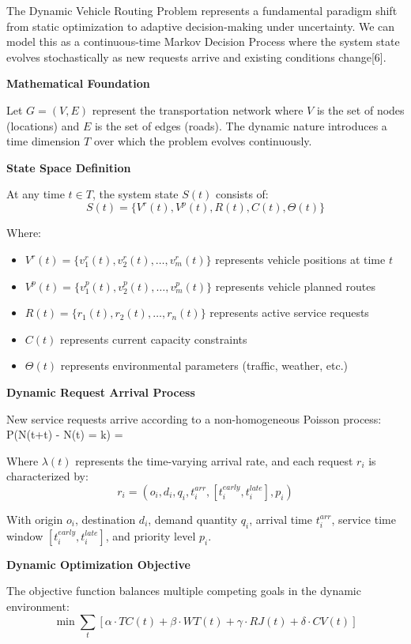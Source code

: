 \documentclass{article}
\begin{document}
The Dynamic Vehicle Routing Problem represents a fundamental paradigm shift from static optimization to adaptive decision-making under uncertainty. We can model this as a continuous-time Markov Decision Process where the system state evolves stochastically as new requests arrive and existing conditions change[6].

\textbf{Mathematical Foundation}

Let $G = (V, E)$ represent the transportation network where $V$ is the set of nodes (locations) and $E$ is the set of edges (roads). The dynamic nature introduces a time dimension $T$ over which the problem evolves continuously.

\textbf{State Space Definition}

At any time $t \in T$, the system state $S(t)$ consists of:
$$ S(t) = \{V^r(t), V^p(t), R(t), C(t), \Theta(t)\} $$

Where:
\begin{itemize}
\item $V^r(t) = \{v_1^r(t), v_2^r(t), \ldots, v_m^r(t)\}$ represents vehicle positions at time $t$
\item $V^p(t) = \{v_1^p(t), v_2^p(t), \ldots, v_m^p(t)\}$ represents vehicle planned routes
\item $R(t) = \{r_1(t), r_2(t), \ldots, r_n(t)\}$ represents active service requests
\item $C(t)$ represents current capacity constraints
\item $\Theta(t)$ represents environmental parameters (traffic, weather, etc.)
\end{itemize}

\textbf{Dynamic Request Arrival Process}

New service requests arrive according to a non-homogeneous Poisson process:
P(N(t+\Delta t) - N(t) = k) = 

Where $\lambda(t)$ represents the time-varying arrival rate, and each request $r_i$ is characterized by:
$$ r_i = (o_i, d_i, q_i, t_i^{arr}, [t_i^{early}, t_i^{late}], p_i) $$

With origin $o_i$, destination $d_i$, demand quantity $q_i$, arrival time $t_i^{arr}$, service time window $[t_i^{early}, t_i^{late}]$, and priority level $p_i$.

\textbf{Dynamic Optimization Objective}

The objective function balances multiple competing goals in the dynamic environment:
$$ \min \sum_{t} \left[ \alpha \cdot TC(t) + \beta \cdot WT(t) + \gamma \cdot RJ(t) + \delta \cdot CV(t) \right] $$
\end{document}

